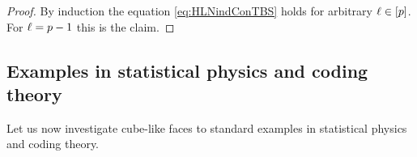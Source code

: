 \begin{proof}

    By induction the equation \eqref{eq:HLNindConTBS} holds for arbitrary $\ell\in[p]$.
    For $\ell=p-1$ this is the claim.
\end{proof}

\subsection{Examples in statistical physics and coding theory}

Let us now investigate cube-like faces to standard examples in statistical physics and coding theory.



